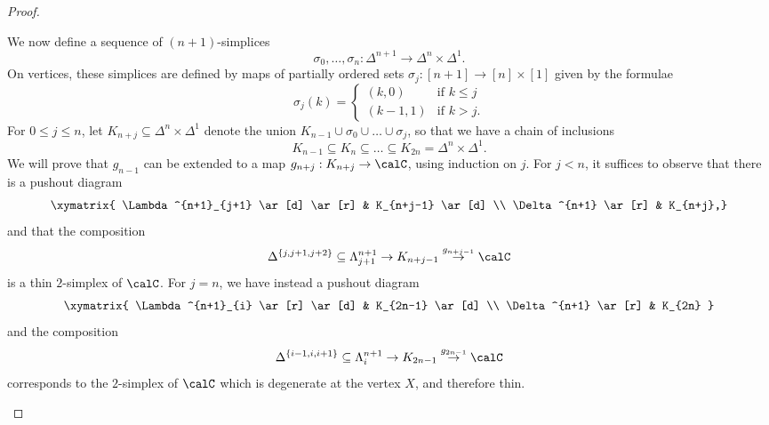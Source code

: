 \begin{proof}
\begin{itemize}
We now define a sequence of $(n+1)$-simplices 
$$ \sigma_0, \ldots, \sigma_n: \Delta^{n+1} \rightarrow \Delta^n \times \Delta^1.$$
On vertices, these simplices are defined by maps of partially ordered sets
$\sigma_{j}: [n+1] \rightarrow [n] \times [1]$ given by the formulae
$$ \sigma_{j}(k) = \begin{cases} (k,0) & \text{if } k \leq j \\
(k-1,1) & \text{if } k > j. \end{cases}$$
For $0 \leq j \leq n$, let $K_{n+j} \subseteq \Delta^{n} \times \Delta^1$ denote the union
$K_{n-1} \cup \sigma_0 \cup \ldots \cup \sigma_j$, so that we have a chain of inclusions
$$ K_{n-1} \subseteq K_{n} \subseteq \ldots \subseteq K_{2n} = \Delta^n \times \Delta^1.$$
We will prove that $g_{n-1}$ can be extended to a map $g_{n+j}: K_{n+j} \rightarrow \calC$,
using induction on $j$. For $j < n$, it suffices to observe that there is a pushout diagram
$$ \xymatrix{ \Lambda^{n+1}_{j+1} \ar[d] \ar[r] & K_{n+j-1} \ar[d] \\
\Delta^{n+1} \ar[r] & K_{n+j},}$$
and that the composition
$$ \Delta^{ \{j,j+1, j+2\} } \subseteq \Lambda^{n+1}_{j+1}
\rightarrow K_{n+j-1} \stackrel{g_{n+j-1}}{\rightarrow} \calC$$
is a thin $2$-simplex of $\calC$. For $j=n$, we have instead a pushout diagram
$$ \xymatrix{ \Lambda^{n+1}_{i} \ar[r] \ar[d] & K_{2n-1} \ar[d] \\
\Delta^{n+1} \ar[r] & K_{2n} }$$
and the composition
$$ \Delta^{ \{i-1, i, i+1\}} \subseteq \Lambda^{n+1}_{i} \rightarrow K_{2n-1} \stackrel{g_{2n-1}}{\rightarrow} \calC$$
corresponds to the $2$-simplex of $\calC$ which is degenerate at the vertex $X$, and therefore thin.


\end{itemize}
\end{proof}
